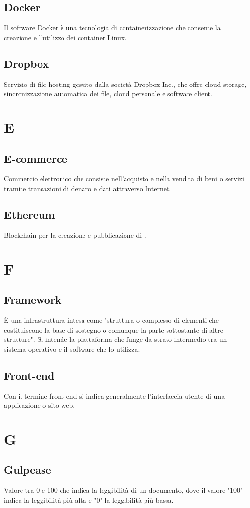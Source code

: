 \subsection{Docker} Il software Docker è una tecnologia di containerizzazione che consente la creazione e l’utilizzo dei container Linux.
\subsection{Dropbox} Servizio di file hosting gestito dalla società Dropbox Inc., che offre cloud storage, sincronizzazione automatica dei file, cloud personale e software client.
\newpage \section{E}
\subsection{E-commerce} Commercio elettronico che consiste nell'acquisto e nella vendita di beni o servizi tramite transazioni di denaro e dati attraverso Internet.
\subsection{Ethereum} Blockchain per la creazione e pubblicazione di .
\newpage \section{F}
\subsection{Framework} È una infrastruttura intesa come "struttura o complesso di elementi che costituiscono la base di sostegno o comunque la parte sottostante di altre strutture". Si intende la piattaforma che funge da strato intermedio tra un sistema operativo e il software che lo utilizza.
\subsection{Front-end} Con il termine front end si indica generalmente l’interfaccia utente di una applicazione o sito web.
\newpage \section{G}
\subsection{Gulpease} Valore tra 0 e 100 che indica la leggibilità di un documento, dove il valore "100" indica la leggibilità più alta e "0" la leggibilità più bassa. 
